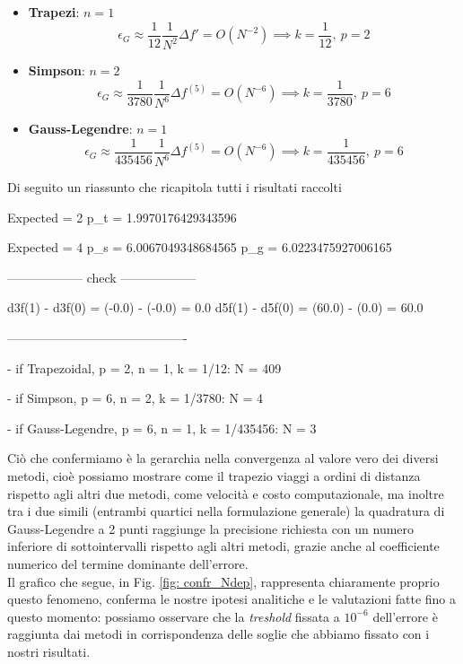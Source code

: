 \newpage
\begin{itemize}
    \item \textbf{Trapezi}: $n=1$
    $$\epsilon_G \approx \frac{1}{12} \frac{1}{ N^2}\Delta f' = O(N^{-2})  \implies k=\frac{1}{12},\ p=2$$
    
    \item \textbf{Simpson}: $n=2$
    $$\epsilon_G \approx \frac{1}{3780} \frac{1}{N^6}\Delta f^{(5)} = O(N^{-6})  \implies k=\frac{1}{3780},\ p=6$$
 
    \item \textbf{Gauss-Legendre}: $n=1$ 
    $$\epsilon_G \approx \frac{1}{435456} \frac{1}{N^6} \Delta f^{(5)} = O(N^{-6})  \implies k=\frac{1}{435456},\ p=6$$
    
    
\end{itemize}



\bigskip\noindent

Di seguito un riassunto che ricapitola tutti i risultati raccolti
\begin{elegantcode}
Expected = 2
    p_t = 1.9970176429343596

Expected = 4
    p_s = 6.0067049348684565
    p_g = 6.0223475927006165

------------------ check ------------------

d3f(1) - d3f(0) = (-0.0) - (-0.0) = 0.0
d5f(1) - d5f(0) = (60.0) - (0.0) = 60.0

-------------------------------------------

- if Trapezoidal, p = 2, n = 1, k = 1/12:
     N = 409

- if Simpson, p = 6, n = 2, k = 1/3780:
     N = 4

- if Gauss-Legendre, p = 6, n = 1, k = 1/435456:
     N = 3
\end{elegantcode}


\bigskip\noindent Ciò che confermiamo è la gerarchia nella convergenza al valore vero dei diversi metodi, cioè possiamo mostrare come il trapezio viaggi a ordini di distanza rispetto agli altri due metodi, come velocità e costo computazionale, ma inoltre tra i due simili (entrambi quartici nella formulazione generale) la quadratura di Gauss-Legendre a 2 punti raggiunge la precisione richiesta con un numero inferiore di sottointervalli rispetto agli altri metodi, grazie anche al coefficiente numerico del termine dominante dell'errore.\\
Il grafico che segue, in Fig. \ref{fig: confr_Ndep}, rappresenta chiaramente proprio questo fenomeno, conferma le nostre ipotesi analitiche e le valutazioni fatte fino a questo momento: possiamo osservare che la \textit{treshold} fissata a $10^{-6}$ dell'errore è raggiunta dai metodi in corrispondenza delle soglie che abbiamo fissato con i nostri risultati. 

